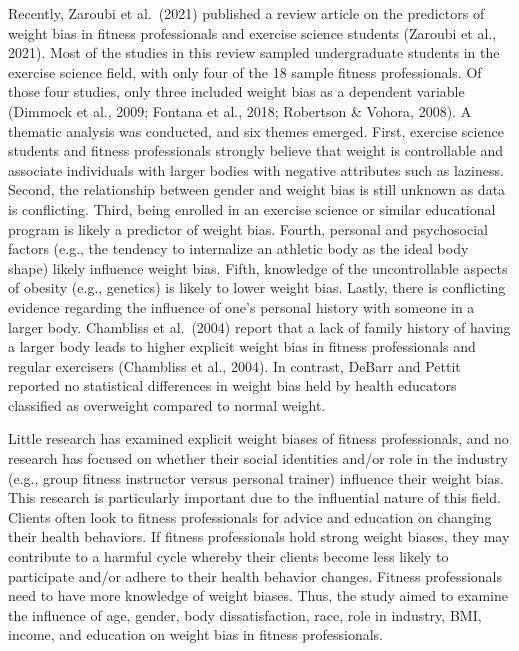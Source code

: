 \documentclass[
  jou,
  longtable,
  colorlinks=true,linkcolor=blue,citecolor=blue,urlcolor=blue]{apa7}
\begin{document}
Recently, Zaroubi et al.~(2021) published a review article on the
predictors of weight bias in fitness professionals and exercise science
students (Zaroubi et al., 2021). Most of the studies in this review
sampled undergraduate students in the exercise science field, with only
four of the 18 sample fitness professionals. Of those four studies, only
three included weight bias as a dependent variable (Dimmock et al.,
2009; Fontana et al., 2018; Robertson \& Vohora, 2008). A thematic
analysis was conducted, and six themes emerged. First, exercise science
students and fitness professionals strongly believe that weight is
controllable and associate individuals with larger bodies with negative
attributes such as laziness. Second, the relationship between gender and
weight bias is still unknown as data is conflicting. Third, being
enrolled in an exercise science or similar educational program is likely
a predictor of weight bias. Fourth, personal and psychosocial factors
(e.g., the tendency to internalize an athletic body as the ideal body
shape) likely influence weight bias. Fifth, knowledge of the
uncontrollable aspects of obesity (e.g., genetics) is likely to lower
weight bias. Lastly, there is conflicting evidence regarding the
influence of one's personal history with someone in a larger body.
Chambliss et al.~(2004) report that a lack of family history of having a
larger body leads to higher explicit weight bias in fitness
professionals and regular exercisers (Chambliss et al., 2004). In
contrast, DeBarr and Pettit reported no statistical differences in
weight bias held by health educators classified as overweight compared
to normal weight.

Little research has examined explicit weight biases of fitness
professionals, and no research has focused on whether their social
identities and/or role in the industry (e.g., group fitness instructor
versus personal trainer) influence their weight bias. This research is
particularly important due to the influential nature of this field.
Clients often look to fitness professionals for advice and education on
changing their health behaviors. If fitness professionals hold strong
weight biases, they may contribute to a harmful cycle whereby their
clients become less likely to participate and/or adhere to their health
behavior changes. Fitness professionals need to have more knowledge of
weight biases. Thus, the study aimed to examine the influence of age,
gender, body dissatisfaction, race, role in industry, BMI, income, and
education on weight bias in fitness professionals.
\end{document}
